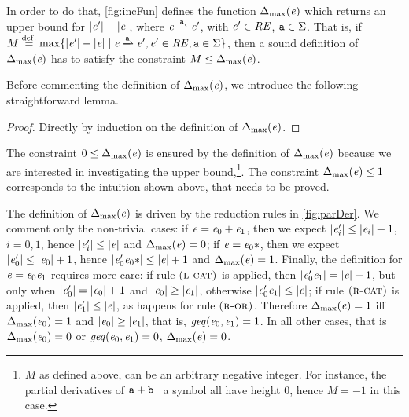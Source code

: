 In order to do that, \cref{fig:incFun} defines the function ${\Delta_{\max}}({\mathit {e}})$ which returns an upper bound for ${\mid}{\mathit {e}'}{\mid}-{\mid}{\mathit {e}}{\mid}$, where
$\re\parDer{\sym}\re'$, with $\mathit {e}'\in\mathit {RE}$, $\mathtt {a}\in\Sigma$.
That is, if $M\stackrel{\mathrm{def.}}{=}\max\{\theight{\re'}-\theight{\re} \mid \re\parDer{\sym}\re', \re'\in\reSet, \sym\in\symAlph\}$, then
a sound definition of ${\Delta_{\max}}({\mathit {e}})$ has to satisfy the constraint $M\leq{\Delta_{\max}}({\mathit {e}})$.

Before commenting the definition of ${\Delta_{\max}}({\mathit {e}})$, we introduce the following straightforward lemma.
\begin{proof}
 Directly by induction on the definition of ${\Delta_{\max}}({\mathit {e}})$.
\end{proof}

The constraint $0\leq{\Delta_{\max}}({\mathit {e}})$ is ensured by the definition of ${\Delta_{\max}}({\mathit {e}})$ because we are interested in investigating the upper bound,\footnote{$M$ as defined above, can be an arbitrary negative integer. For instance, the partial derivatives of $\mathtt {a}\mathbin{+}\mathtt {b}$ \wrt~a symbol all have height 0, hence $M=-1$ in this case.}. The constraint ${\Delta_{\max}}({\mathit {e}})\leq 1$ corresponds to the intuition shown above, that needs to be proved.

The definition of ${\Delta_{\max}}({\mathit {e}})$ is driven by the reduction rules in \cref{fig:parDer}. We comment only the non-trivial cases: if $\mathit {e}=\mathit {e}_0\mathbin{+}\mathit {e}_1$, then we expect ${\mid}{\mathit {e}'_i}{\mid}\leq{\mid}{\ensuremath{\mathit {e}}_i}{\mid}+1$, $i=0,1$,
hence ${\mid}{\mathit {e}'_i}{\mid}\leq{\mid}{\ensuremath{\mathit {e}}}{\mid}$ and ${\Delta_{\max}}({\mathit {e}})=0$;
if $\mathit {e}={\mathit {e}_0}*$, then we expect ${\mid}{\mathit {e}'_0}{\mid}\leq{\mid}{\ensuremath{\mathit {e}}_0}{\mid}+1$,
hence ${\mid}{\mathit {e}'_0{\mathit {e}_0}*}{\mid}\leq{\mid}{\ensuremath{\mathit {e}}}{\mid}+1$ and ${\Delta_{\max}}({\mathit {e}})=1$. Finally, the definition for $\mathit {e}=\mathit {e}_0\mathit {e}_1$ requires more care:
if rule $\textsc{({l-cat})}$ is applied, then ${\mid}{\mathit {e}_0'\mathit {e}_1}{\mid}={\mid}{\mathit {e}}{\mid}+1$, but only when ${\mid}{\mathit {e}_0'}{\mid}={\mid}{\mathit {e}_0}{\mid}+1$ and ${\mid}{\mathit {e}_0}{\mid}\geq{\mid}{\ensuremath{\mathit {e}}_1}{\mid}$, otherwise ${\mid}{\mathit {e}_0'\mathit {e}_1}{\mid}\leq{\mid}{\ensuremath{\mathit {e}}}{\mid}$; if rule $\textsc{({r-cat})}$ is applied, then ${\mid}{\mathit {e}'_1}{\mid}\leq{\mid}{\ensuremath{\mathit {e}}}{\mid}$, as happens for rule $\textsc{({r-or})}$. Therefore ${\Delta_{\max}}({\mathit {e}})=1$ iff ${\Delta_{\max}}({\mathit {e}_0})=1$ and ${\mid}{\mathit {e}_0}{\mid}\geq{\mid}{\ensuremath{\mathit {e}}_1}{\mid}$, that is, $\mathit{geq}({\mathit {e}_0},{\mathit {e}_1})=1$. In all other cases, that is ${\Delta_{\max}}({\mathit {e}_0})=0$ or $\mathit{geq}({\mathit {e}_0},{\mathit {e}_1})=0$, ${\Delta_{\max}}({\mathit {e}})=0$.

